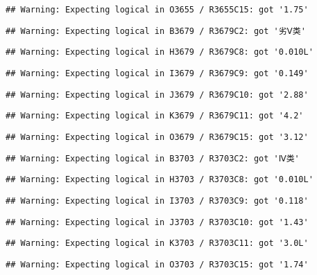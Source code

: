 \documentclass[
]{article}
\begin{document}
\begin{verbatim}
## Warning: Expecting logical in O3655 / R3655C15: got '1.75'
\end{verbatim}

\begin{verbatim}
## Warning: Expecting logical in B3679 / R3679C2: got '劣Ⅴ类'
\end{verbatim}

\begin{verbatim}
## Warning: Expecting logical in H3679 / R3679C8: got '0.010L'
\end{verbatim}

\begin{verbatim}
## Warning: Expecting logical in I3679 / R3679C9: got '0.149'
\end{verbatim}

\begin{verbatim}
## Warning: Expecting logical in J3679 / R3679C10: got '2.88'
\end{verbatim}

\begin{verbatim}
## Warning: Expecting logical in K3679 / R3679C11: got '4.2'
\end{verbatim}

\begin{verbatim}
## Warning: Expecting logical in O3679 / R3679C15: got '3.12'
\end{verbatim}

\begin{verbatim}
## Warning: Expecting logical in B3703 / R3703C2: got 'Ⅳ类'
\end{verbatim}

\begin{verbatim}
## Warning: Expecting logical in H3703 / R3703C8: got '0.010L'
\end{verbatim}

\begin{verbatim}
## Warning: Expecting logical in I3703 / R3703C9: got '0.118'
\end{verbatim}

\begin{verbatim}
## Warning: Expecting logical in J3703 / R3703C10: got '1.43'
\end{verbatim}

\begin{verbatim}
## Warning: Expecting logical in K3703 / R3703C11: got '3.0L'
\end{verbatim}

\begin{verbatim}
## Warning: Expecting logical in O3703 / R3703C15: got '1.74'
\end{verbatim}
\end{document}
